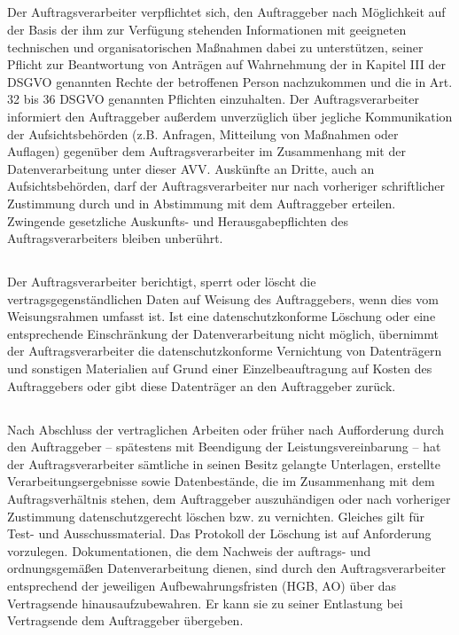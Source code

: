 \documentclass[10pt]{article}
\begin{document}
\subsection{} Der Auftragsverarbeiter verpflichtet sich, den Auftraggeber nach Möglichkeit auf der
Basis der ihm zur Verfügung stehenden Informationen mit geeigneten technischen
und organisatorischen Maßnahmen dabei zu unterstützen, seiner Pflicht zur
Beantwortung von Anträgen auf Wahrnehmung der in Kapitel III der DSGVO
genannten Rechte der betroffenen Person nachzukommen und die in Art. 32 bis 36
DSGVO genannten Pflichten einzuhalten. Der Auftragsverarbeiter informiert den
Auftraggeber außerdem unverzüglich über jegliche Kommunikation der
Aufsichtsbehörden (z.B. Anfragen, Mitteilung von Maßnahmen oder Auflagen)
gegenüber dem Auftragsverarbeiter im Zusammenhang mit der Datenverarbeitung
unter dieser AVV. Auskünfte an Dritte, auch an Aufsichtsbehörden, darf der
Auftragsverarbeiter nur nach vorheriger schriftlicher Zustimmung durch und in
Abstimmung mit dem Auftraggeber erteilen. Zwingende gesetzliche Auskunfts- und
Herausgabepflichten des Auftragsverarbeiters bleiben unberührt.

\subsection{} Der Auftragsverarbeiter berichtigt, sperrt oder löscht die
vertragsgegenständlichen Daten auf Weisung des Auftraggebers, wenn dies vom
Weisungsrahmen umfasst ist. Ist eine datenschutzkonforme Löschung oder eine
entsprechende Einschränkung der Datenverarbeitung nicht möglich, übernimmt der
Auftragsverarbeiter die datenschutzkonforme Vernichtung von Datenträgern und
sonstigen Materialien auf Grund einer Einzelbeauftragung auf Kosten des
Auftraggebers oder gibt diese Datenträger an den Auftraggeber zurück.

\subsection{} Nach Abschluss der vertraglichen Arbeiten oder früher nach Aufforderung
durch den Auftraggeber – spätestens mit Beendigung der Leistungsvereinbarung –
hat der Auftragsverarbeiter sämtliche in seinen Besitz gelangte Unterlagen, erstellte
Verarbeitungsergebnisse sowie Datenbestände, die im Zusammenhang mit dem
Auftragsverhältnis stehen, dem Auftraggeber auszuhändigen oder nach vorheriger
Zustimmung datenschutzgerecht löschen bzw. zu vernichten. Gleiches gilt für Test-
und Ausschussmaterial. Das Protokoll der Löschung ist auf Anforderung vorzulegen.
Dokumentationen, die dem Nachweis der auftrags- und ordnungsgemäßen
Datenverarbeitung dienen, sind durch den Auftragsverarbeiter entsprechend der
jeweiligen Aufbewahrungsfristen (HGB, AO) über das Vertragsende hinausaufzubewahren. Er kann sie zu seiner Entlastung bei Vertragsende dem Auftraggeber
übergeben.
\end{document}
